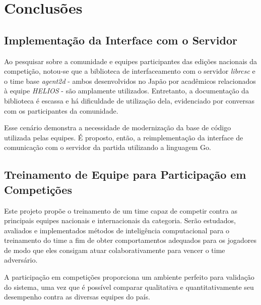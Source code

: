 
\chapter{Conclusões}

\label{CapConclusoes}


\section{Implementação da Interface com o Servidor}
\par Ao pesquisar sobre a comunidade e equipes participantes das edições nacionais da competição, notou-se que a biblioteca de interfaceamento com o servidor \textit{librcsc} e o time base \textit{agent2d} - ambos desenvolvidos no Japão por acadêmicos relacionados à equipe \textit{HELIOS} - são amplamente utilizados. Entretanto, a documentação da biblioteca é escassa e há dificuldade de utilização dela, evidenciado por conversas com os participantes da comunidade.

\par Esse cenário demonstra a necessidade de modernização da base de código utilizada pelas equipes.
É proposto, então, a reimplementação da interface de comunicação com o servidor da partida utilizando a linguagem Go.

\section{Treinamento de Equipe para Participação em Competições}
\par Este projeto propõe o treinamento de um time capaz de competir contra as principais equipes nacionais e internacionais da categoria.
Serão estudados, avaliados e implementados métodos de inteligência computacional para o treinamento do time a fim de obter comportamentos adequados para os jogadores de modo que eles consigam atuar colaborativamente para vencer o time adversário.

A participação em competições proporciona um ambiente perfeito para validação do sistema, uma vez que é possível comparar qualitativa e quantitativamente seu desempenho contra as diversas equipes do país.
